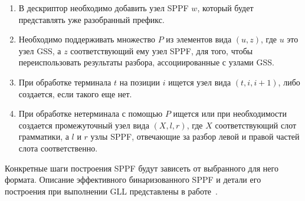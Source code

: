 \begin{enumerate}
  \item В дескриптор необходимо добавить узел SPPF $ w $, который будет представлять уже разобранный префикс.
  \item Необходимо поддерживать множество $ P $ из элементов вида $ (u, z) $, где $ u $ это узел GSS, а $ z $ соответствующий ему узел SPPF, для того, чтобы переиспользовать результаты разбора, ассоциированные с узлами GSS.
  \item При обработке терминала $ t $ на позиции $ i $ ищется узел вида $ (t, i, i + 1) $, либо создается, если такого еще нет.
  \item При обработке нетерминала с помощью $ P $ ищется или при необходимости создается промежуточный узел вида $ (X, l, r) $, где $ X $ соответствующий слот грамматики, а $ l $ и $ r $ узлы SPPF, отвечающие за разбор левой и правой частей слота соответственно.
\end{enumerate}

Конкретные шаги построения SPPF будут зависеть от выбранного для него формата. Описание эффективного бинаризованного SPPF и детали его построения при выполнении GLL представлены в работе~\cite{10.1007/978-3-662-46663-6_5}.
